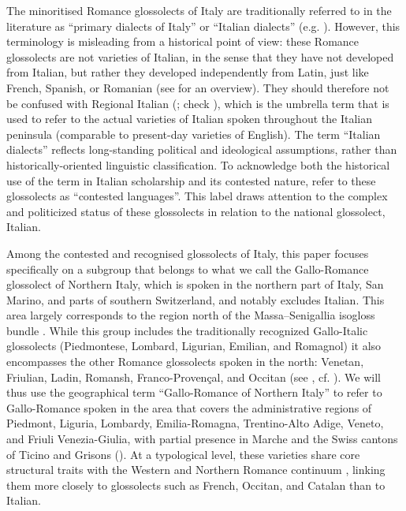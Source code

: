 \documentclass[a4paper,11pt]{article}
\begin{document}
The minoritised Romance glossolects of Italy are traditionally referred to in the literature as ``primary dialects of Italy'' \citep[487]{telmon2017dialects} or ``Italian dialects'' (e.g. \citealp{ledgeway2003linguistic, cortelazzo1998dialetti}). However, this terminology is misleading from a historical point of view: these Romance glossolects are not varieties of Italian, in the sense that they have not developed from Italian, but rather they developed independently from Latin, just like French, Spanish, or Romanian (see \citealp{maidenandparry1997} for an overview). They should therefore not be confused with Regional Italian (\citealt{berruto1989main, berruto1993varieta}; check \citealt{berruto2018}), which is the umbrella term that is used to refer to the actual varieties of Italian spoken throughout the Italian peninsula (comparable to present-day varieties of English). The term ``Italian dialects'' reflects long-standing political and ideological assumptions, rather than historically-oriented linguistic classification.
To acknowledge both the historical use of the term in Italian scholarship and its contested nature, \citet{tamburelliandtosco} refer to these glossolects as ``contested languages''. This label draws attention to the complex and politicized status of these glossolects in relation to the national glossolect, Italian.


Among the contested and recognised glossolects of Italy, this paper focuses specifically on a subgroup that belongs to what we call the Gallo-Romance glossolect of Northern Italy, which is spoken in the northern part of Italy, San Marino, and parts of southern Switzerland, and notably excludes Italian. This area largely corresponds to the region north of the Massa--Senigallia isogloss bundle \citep{maidenandparry1997, beninca2016}. While this group includes the traditionally recognized Gallo-Italic glossolects (Piedmontese, Lombard, Ligurian, Emilian, and Romagnol) it also encompasses the other Romance glossolects spoken in the north: Venetan, Friulian, Ladin, Romansh, Franco-Provençal, and Occitan  (see , cf. \citealp{de2020debunking}).
We will thus use the geographical term ``Gallo-Romance of Northern Italy'' to refer to Gallo-Romance spoken in the area that covers the administrative regions of Piedmont, Liguria, Lombardy, Emilia-Romagna, Trentino-Alto Adige, Veneto, and Friuli Venezia-Giulia, with partial presence in Marche and the Swiss cantons of Ticino and Grisons (). At a typological level, these varieties share core structural traits with the Western and Northern Romance continuum \citep{zamboni1998, renziandreose2015}, linking them more closely to glossolects such as French, Occitan, and Catalan than to Italian.
\end{document}
